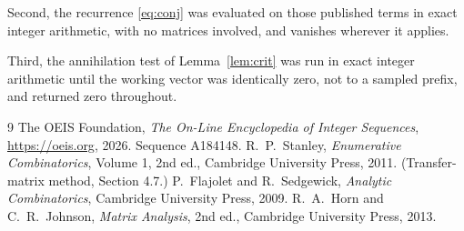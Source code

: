 \documentclass[11pt,a4paper]{article}
\theoremstyle{plain}
\theoremstyle{definition}
\begin{document}
Second, the recurrence \eqref{eq:conj} was evaluated on those published terms in exact
integer arithmetic, with no matrices involved, and vanishes wherever it applies.

Third, the annihilation test of Lemma~\ref{lem:crit} was run in exact integer arithmetic
until the working vector was identically zero, not to a sampled prefix, and returned zero
throughout.

\begin{thebibliography}{9}
 The OEIS Foundation, \emph{The On-Line Encyclopedia of Integer
Sequences}, \url{https://oeis.org}, 2026. Sequence A184148.
 R.~P.~Stanley, \emph{Enumerative Combinatorics}, Volume 1, 2nd ed.,
Cambridge University Press, 2011. (Transfer-matrix method, Section 4.7.)
 P.~Flajolet and R.~Sedgewick, \emph{Analytic Combinatorics}, Cambridge
University Press, 2009.
 R.~A.~Horn and C.~R.~Johnson, \emph{Matrix Analysis}, 2nd ed., Cambridge
University Press, 2013.
\end{thebibliography}
\end{document}
